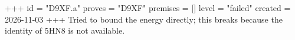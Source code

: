 +++
id = "D9XF.a"
proves = "D9XF"
premises = []
level = "failed"
created = 2026-11-03
+++
Tried to bound the energy directly; this breaks because the identity of 5HN8 is not available.
